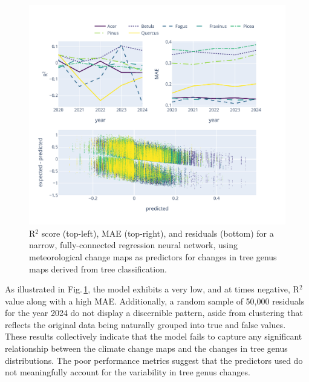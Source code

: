\begin{figure}[ht]
    \centering
    \includegraphics[width=0.98\linewidth, trim={10pt 20pt 50pt 40pt}, clip]{figures/figures_climate/regression_results.pdf}
    \caption{R$^2$ score (top-left), MAE (top-right), and residuals (bottom) for a narrow, fully-connected regression neural network, using meteorological change maps as predictors for changes in tree genus maps derived from tree classification.}
    \label{fig:regression_results}
\end{figure}

As illustrated in Fig.\,\ref{fig:regression_results}, the model exhibits a very low, and at times negative, R$^2$ value along with a high MAE. Additionally, a random sample of 50,000 residuals for the year 2024 do not display a discernible pattern, aside from clustering that reflects the original data being naturally grouped into true and false values. These results collectively indicate that the model fails to capture any significant relationship between the climate change maps and the changes in tree genus distributions. The poor performance metrics suggest that the predictors used do not meaningfully account for the variability in tree genus changes.